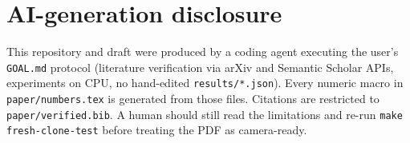 \documentclass[10pt,twocolumn]{article}
\begin{document}
\section*{AI-generation disclosure}
This repository and draft were produced by a coding agent executing the
user's \texttt{GOAL.md} protocol (literature verification via arXiv and
Semantic Scholar APIs, experiments on CPU, no hand-edited
\texttt{results/*.json}). Every numeric macro in \texttt{paper/numbers.tex}
is generated from those files. Citations are restricted to
\texttt{paper/verified.bib}. A human should still read the limitations
and re-run \texttt{make fresh-clone-test} before treating the PDF as
camera-ready.



\end{document}
